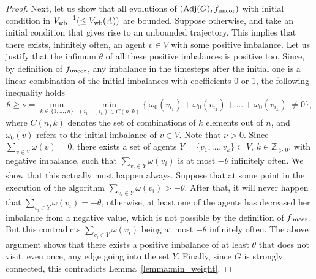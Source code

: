\documentclass[final]{siamltex}
\begin{document}
\begin{proof}
  Next, let us show that all evolutions of $
  ({\operatorname{Adj}}(G),{{f}_{\textup{{imcor}}}}) $ with initial condition in $
  {{V}_{\textup{{wb}}}}^{-1}(\le {{V}_{\textup{{wb}}}}(A)) $ are bounded.  Suppose
  otherwise, and take an initial condition that gives rise to an
  unbounded trajectory.  This implies that there exists, infinitely
  often, an agent $ v \in V$ with some positive imbalance. Let us
  justify that the infimum $\theta$ of all these positive imbalances
  is positive too. Since, by definition of ${{f}_{\textup{{imcor}}}} $, any
  imbalance in the timesteps after the initial one is a linear
  combination of the initial imbalances with coefficients $ 0 $ or $ 1
  $, the following inequality holds
  \[
  \theta\geq \nu = \min_{k\in\{1,\ldots,n\}} \min_{(i_1,\dots,i_k) \in
    C(n,k)} \{ |\omega_0(v_{i_1})+\omega_0(v_{i_2})
  +\ldots+\omega_0(v_{i_k})|\neq 0\},
  \]
  where $C(n,k)$ denotes the set of combinations of $k$ elements out
  of $n$, and $ \omega_0(v) $ refers to the initial imbalance of $ v
  \in V $.  Note that $\nu>0$.  Since $ \sum_{v\in V}\omega(v)=0 $,
  there exists a set of agents $ Y=\{v_1,\ldots, v_k\} \subset V $, $
  k \in \mathbb{Z}_{>0} $, with negative imbalance, such that $
  \sum_{v_i\in Y}\omega(v_i) $ is at most $ -\theta $ infinitely
  often. We show that this actually must happen always.  Suppose that
  at some point in the execution of the algorithm $\sum_{v_i\in
    Y}\omega(v_i)>-\theta $. After that, it will never happen that $
  \sum_{v_i\in Y}\omega(v_i)=-\theta $, otherwise, at least one of the
  agents has decreased her imbalance from a negative value, which is
  not possible by the definition of $ {{f}_{\textup{{imcor}}}} $.  But this
  contradicts $ \sum_{v_i\in Y}\omega(v_i) $ being at most $ -\theta $
  infinitely often. The above argument shows that there exists a
  positive imbalance of at least $ \theta $ that does not visit, even
  once, any edge going into the set $ Y $. Finally, since $G$ is
  strongly connected, this contradicts Lemma~\ref{lemma:min_weight}.


\end{proof}
\end{document}
